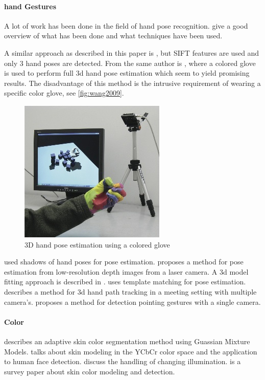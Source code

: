 \paragraph{hand Gestures}
A lot of work has been done in the field of hand pose recognition. \cite{Erol2007,Mitra2007} give a good overview of what has been done and what techniques have been used.

A similar approach as described in this paper is \cite{Wang2007}, but SIFT features are used and only 3 hand poses are detected. From the same author is \cite{Wang2009}, where a colored glove is used to perform full 3d hand pose estimation which seem to yield promising results. The disadvantage of this method is the intrusive requirement of wearing a specific color glove, see \autoref{fig:wang2009}.

\begin{figure}[htbp]
	\center{}
	\includegraphics[width=0.4\linewidth]{figures/wang2009.jpg}
	\caption{3D hand pose estimation using a colored glove}
	\label{fig:wang2009}
\end{figure}

\cite{Segen1999} used shadows of hand poses for pose estimation. \cite{Mo2006} proposes a method for pose estimation from low-resolution depth images from a laser camera. A 3d model fitting approach is described in \cite{Athitsos2003,laGorce2010}. \cite{Stenger2006} uses template matching for pose estimation. \cite{Xiong2006} describes a method for 3d hand path tracking in a meeting setting with multiple camera's. \cite{Nickel2007} proposes a method for detection pointing gestures with a single camera.


\paragraph{Color}
 \cite{Hassanpour2008} describes an adaptive skin color segmentation method using Guassian Mixture Models. \cite{Phung2002} talks about skin modeling in the YCbCr color space and the application to human face detection. \cite{Sigal2004,Soriano2000,Stoerring1999} discuss the handling of changing illumination. \cite{Kakumanu2007} is a survey paper about skin color modeling and detection.




